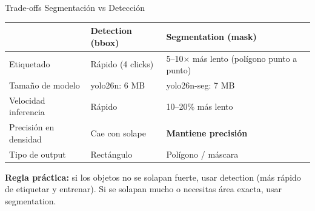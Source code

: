 \begin{frame}[shrink]{Trade-offs Segmentaci\'on vs Detecci\'on}
  \vspace{8pt}
  {\footnotesize
  \begin{tabular}{@{}p{3.5cm} p{4.0cm} p{4.5cm}@{}}
    \toprule
    & \textbf{Detection (bbox)} & \textbf{Segmentation (mask)} \\
    \midrule
    \rowcolor{arcaGray}
    Etiquetado
    & R\'apido (4 clicks)
    & 5--10$\times$ m\'as lento (pol\'igono punto a punto) \\
    Tama\~no de modelo
    & yolo26n: 6 MB
    & yolo26n-seg: 7 MB \\
    \rowcolor{arcaGray}
    Velocidad inferencia
    & R\'apido
    & 10--20\% m\'as lento \\
    Precisi\'on en densidad
    & Cae con solape
    & \textbf{Mantiene precisi\'on} \\
    \rowcolor{arcaGray}
    Tipo de output
    & Rect\'angulo
    & Pol\'igono / m\'ascara \\
    \bottomrule
  \end{tabular}
  }

  \vspace{10pt}
  \begin{tcolorbox}[colback=codeGreen!8, colframe=codeGreen, boxrule=0.5pt,
    arc=2pt, left=6pt, right=6pt, top=4pt, bottom=4pt]
    {\scriptsize\color{arcaDark}
    \faKey\hspace{4pt}\textbf{Regla pr\'actica:} si los objetos no se solapan
    fuerte, usar detection (m\'as r\'apido de etiquetar y entrenar). Si se
    solapan mucho o necesitas \'area exacta, usar segmentation.}
  \end{tcolorbox}
\end{frame}

